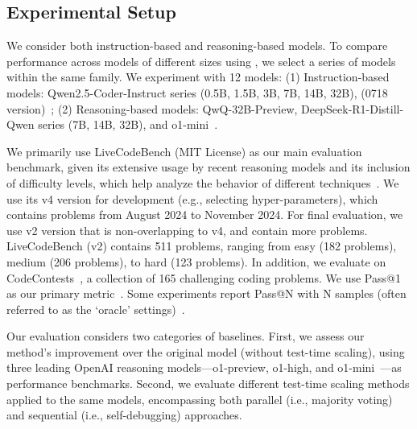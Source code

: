 
\subsection{Experimental Setup}

 We consider both instruction-based and reasoning-based models. 
To compare performance across models of different sizes using \frameworkname, we select a series of models within the same family. 
We experiment with 12 models: (1) Instruction-based models: Qwen2.5-Coder-Instruct series (0.5B, 1.5B, 3B, 7B, 14B, 32B), \fouromini (0718 version)~\citep{hui2024qwen2, achiam2023gpt}; (2) Reasoning-based models: QwQ-32B-Preview, DeepSeek-R1-Distill-Qwen series (7B, 14B, 32B), and o1-mini~\citep{qwen_qwq_2024, guo2025deepseek, openai_learning_to_reason_2024}.

We primarily use LiveCodeBench (MIT License) as our main evaluation benchmark, given its extensive usage by recent reasoning models and its inclusion of difficulty levels, which help analyze the behavior of different techniques~\citep{jain2024livecodebench,deepseek_r1_lite_2024,qwen_qwq_2024}. 
We use its v4 version for development (e.g., selecting hyper-parameters), which contains problems from August 2024 to November 2024.
For final evaluation, we use v2 version that is non-overlapping to v4, and contain more problems. LiveCodeBench (v2) contains 511 problems, ranging from easy (182 problems), medium (206 problems), to hard (123 problems). 
In addition, we evaluate \frameworkname on CodeContests~\citep{li2022competition}, a collection of 165 challenging coding problems.
We use Pass@1 as our primary metric~\citep{chen2021evaluating}. Some experiments report Pass@N with N samples (often referred to as the `oracle' settings)~\citep{stroebl2024inference, brown2024large}.

 Our evaluation considers two categories of baselines. First, we assess our method's improvement over the original model (without test-time scaling), using three leading OpenAI reasoning models—o1-preview, o1-high, and o1-mini~\citep{openai_learning_to_reason_2024}—as performance benchmarks. Second, we evaluate different test-time scaling methods applied to the same models, encompassing both parallel (i.e., majority voting) and sequential (i.e., self-debugging) approaches.

